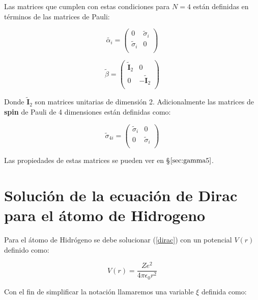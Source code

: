 \documentclass[a4paper, 12pt]{article} %
\begin{document}
Las matrices que cumplen con estas condiciones para $N=4$ est\'an definidas en t\'erminos
de las matrices de Pauli:

\begin{equation}
\widetilde{\alpha_i}=
\begin{pmatrix}
0 & \widetilde{\sigma}_i\\
\widetilde{\sigma}_i & 0 \\
\end{pmatrix}
\end{equation}

\begin{equation}
\widetilde{\beta}=
\begin{pmatrix}
\widetilde{\mathbf{I}}_2 & 0\\
0 & -\widetilde{\mathbf{I}}_2 \\
\end{pmatrix}
\end{equation}

Donde $\widetilde{\mathbf{I}}_2$ son matrices unitarias de dimensi\'on 2. 
Adicionalmente las matrices de \textbf{spin} de Pauli de 4 dimensiones
est\'an definidas como:

\begin{equation}
\widetilde{\sigma}_{4i}=
\begin{pmatrix}
\widetilde{\sigma}_i & 0 \\
0 & \widetilde{\sigma}_i  \\
\end{pmatrix}
\end{equation}

Las propiedades de estas matrices se pueden ver en \S$\ref{sec:gamma5}$.


\section{Soluci\'on de la ecuaci\'on de Dirac para el \'atomo de Hidrogeno}


Para el \'atomo de Hidr\'ogeno se debe solucionar (\ref{dirac})
con un potencial $V(r)$ definido como:

\begin{equation}
V(r) = \dfrac{Ze^2}{4\pi\epsilon_0 r^2}
\end{equation}

Con el fin de simplificar la notaci\'on llamaremos una variable
$\xi$ definida como:
\end{document}
